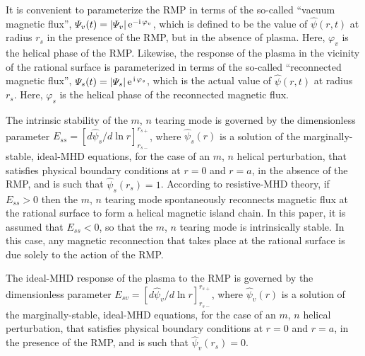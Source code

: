 \documentclass[12pt,prb,aps]{revtex4-1}
\begin{document}
It is convenient to parameterize the RMP in terms of the so-called ``vacuum magnetic flux'', ${\mit\Psi}_v(t) = |{\mit\Psi}_v|\,{\rm e}^{-{\rm i}\,\varphi_v}$,
which is defined to be the value of $\hat{\psi}(r,t)$ at radius $r_s$ in the presence of the RMP, but in the absence of plasma. Here,
$\varphi_v$ is the helical phase of the RMP. Likewise, the response of the plasma in the vicinity of the rational
surface is parameterized in terms of the so-called ``reconnected magnetic flux'', ${\mit\Psi}_s(t)=|{\mit\Psi}_s|\,{\rm e}^{\,{\rm i}\,\varphi_s}$, 
which is the actual value of $\hat{\psi}(r,t)$ at radius $r_s$. Here, $\varphi_s$ is the helical phase of
the reconnected magnetic flux.

The intrinsic stability of the $m$, $n$ tearing mode is governed by the dimensionless parameter
$E_{ss}= [d\hat{\psi}_s/d\ln r]_{r_{s-}}^{r_{s+}}$, where $\hat{\psi}_s(r)$
is a solution of the marginally-stable, ideal-MHD equations, for the case of an $m$, $n$ helical
perturbation, that satisfies physical boundary conditions at $r=0$ and $r=a$, in the absence of the
RMP, and is such that $\hat{\psi}_s(r_s)=1$.\cite{fkr,am1} According to resistive-MHD theory,\cite{fkr,ruth}
if $E_{ss}>0$ then the $m$, $n$ tearing mode spontaneously reconnects magnetic flux at the rational
surface to form a helical magnetic island chain. In this paper, it is assumed that $E_{ss}<0$, so that the
$m$, $n$ tearing mode is intrinsically stable. In this case, any magnetic reconnection that takes place
at the rational surface is due solely to the action of the RMP.

The ideal-MHD response of the plasma to the RMP is governed by the dimensionless parameter
$E_{sv}= [d\hat{\psi}_v/d\ln r]_{r_{s-}}^{r_{s+}}$, where $\hat{\psi}_v(r)$
is a solution of the marginally-stable, ideal-MHD equations, for the case of an $m$, $n$ helical
perturbation, that satisfies physical boundary conditions at $r=0$ and $r=a$, in the presence of the
RMP, and is such that $\hat{\psi}_v(r_s)=0$.\cite{am1} 
\end{document}
